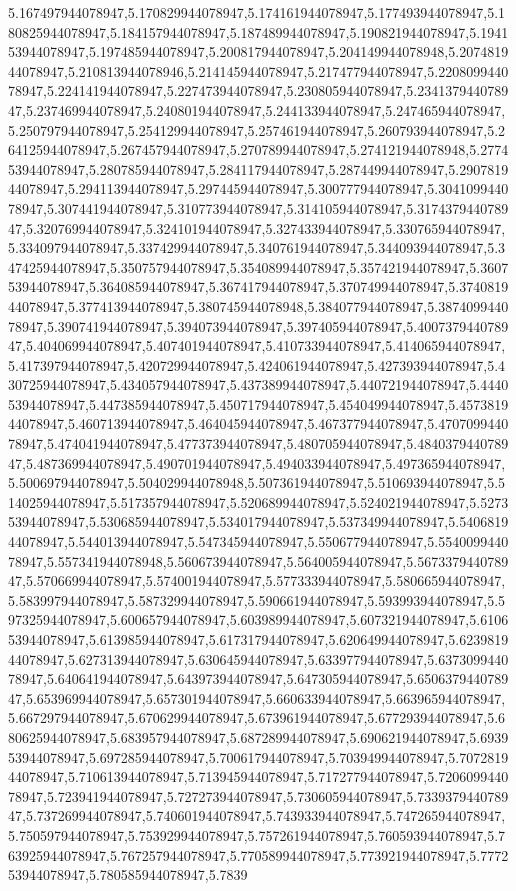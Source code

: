 5.167497944078947,5.170829944078947,5.174161944078947,5.177493944078947,5.180825944078947,5.184157944078947,5.187489944078947,5.190821944078947,5.194153944078947,5.197485944078947,5.200817944078947,5.204149944078948,5.207481944078947,5.210813944078946,5.214145944078947,5.217477944078947,5.220809944078947,5.224141944078947,5.227473944078947,5.230805944078947,5.234137944078947,5.237469944078947,5.240801944078947,5.244133944078947,5.247465944078947,5.250797944078947,5.254129944078947,5.257461944078947,5.260793944078947,5.264125944078947,5.267457944078947,5.270789944078947,5.274121944078948,5.277453944078947,5.280785944078947,5.284117944078947,5.287449944078947,5.290781944078947,5.294113944078947,5.297445944078947,5.300777944078947,5.304109944078947,5.307441944078947,5.310773944078947,5.314105944078947,5.317437944078947,5.320769944078947,5.324101944078947,5.327433944078947,5.330765944078947,5.334097944078947,5.337429944078947,5.340761944078947,5.344093944078947,5.347425944078947,5.350757944078947,5.354089944078947,5.357421944078947,5.360753944078947,5.364085944078947,5.367417944078947,5.370749944078947,5.374081944078947,5.377413944078947,5.380745944078948,5.384077944078947,5.387409944078947,5.390741944078947,5.394073944078947,5.397405944078947,5.400737944078947,5.404069944078947,5.407401944078947,5.410733944078947,5.414065944078947,5.417397944078947,5.420729944078947,5.424061944078947,5.427393944078947,5.430725944078947,5.434057944078947,5.437389944078947,5.440721944078947,5.444053944078947,5.447385944078947,5.450717944078947,5.454049944078947,5.457381944078947,5.460713944078947,5.464045944078947,5.467377944078947,5.470709944078947,5.474041944078947,5.477373944078947,5.480705944078947,5.484037944078947,5.487369944078947,5.490701944078947,5.494033944078947,5.497365944078947,5.500697944078947,5.504029944078948,5.507361944078947,5.510693944078947,5.514025944078947,5.517357944078947,5.520689944078947,5.524021944078947,5.527353944078947,5.530685944078947,5.534017944078947,5.537349944078947,5.540681944078947,5.544013944078947,5.547345944078947,5.550677944078947,5.554009944078947,5.557341944078948,5.560673944078947,5.564005944078947,5.567337944078947,5.570669944078947,5.574001944078947,5.577333944078947,5.580665944078947,5.583997944078947,5.587329944078947,5.590661944078947,5.593993944078947,5.597325944078947,5.600657944078947,5.603989944078947,5.607321944078947,5.610653944078947,5.613985944078947,5.617317944078947,5.620649944078947,5.623981944078947,5.627313944078947,5.630645944078947,5.633977944078947,5.637309944078947,5.640641944078947,5.643973944078947,5.647305944078947,5.650637944078947,5.653969944078947,5.657301944078947,5.660633944078947,5.663965944078947,5.667297944078947,5.670629944078947,5.673961944078947,5.677293944078947,5.680625944078947,5.683957944078947,5.687289944078947,5.690621944078947,5.693953944078947,5.697285944078947,5.700617944078947,5.703949944078947,5.707281944078947,5.710613944078947,5.713945944078947,5.717277944078947,5.720609944078947,5.723941944078947,5.727273944078947,5.730605944078947,5.733937944078947,5.737269944078947,5.740601944078947,5.743933944078947,5.747265944078947,5.750597944078947,5.753929944078947,5.757261944078947,5.760593944078947,5.763925944078947,5.767257944078947,5.770589944078947,5.773921944078947,5.777253944078947,5.780585944078947,5.7839